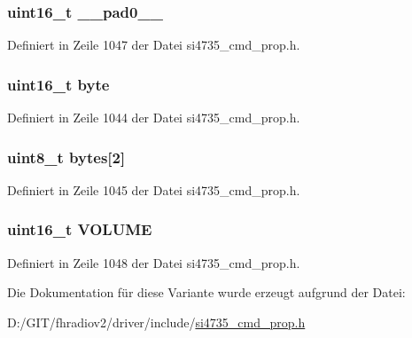 \subsubsection[{\+\_\+\+\_\+pad0\+\_\+\+\_\+}]{\setlength{\rightskip}{0pt plus 5cm}uint16\+\_\+t \+\_\+\+\_\+pad0\+\_\+\+\_\+}\label{unionrx__volume_a77132c2c26a75f5b8751b235cda23828}


Definiert in Zeile 1047 der Datei si4735\+\_\+cmd\+\_\+prop.\+h.

\hypertarget{unionrx__volume_ab0549c1b5ea980a02e7eab77e21fea49}{}
\subsubsection[{byte}]{\setlength{\rightskip}{0pt plus 5cm}uint16\+\_\+t byte}\label{unionrx__volume_ab0549c1b5ea980a02e7eab77e21fea49}


Definiert in Zeile 1044 der Datei si4735\+\_\+cmd\+\_\+prop.\+h.

\hypertarget{unionrx__volume_a46e4c05d20a047ec169f60d3167e912e}{}
\subsubsection[{bytes}]{\setlength{\rightskip}{0pt plus 5cm}uint8\+\_\+t bytes\mbox{[}2\mbox{]}}\label{unionrx__volume_a46e4c05d20a047ec169f60d3167e912e}


Definiert in Zeile 1045 der Datei si4735\+\_\+cmd\+\_\+prop.\+h.

\hypertarget{unionrx__volume_a03739146af570e536bfcb72ec21ffee9}{}
\subsubsection[{V\+O\+L\+U\+M\+E}]{\setlength{\rightskip}{0pt plus 5cm}uint16\+\_\+t V\+O\+L\+U\+M\+E}\label{unionrx__volume_a03739146af570e536bfcb72ec21ffee9}


Definiert in Zeile 1048 der Datei si4735\+\_\+cmd\+\_\+prop.\+h.



Die Dokumentation für diese Variante wurde erzeugt aufgrund der Datei\+:\begin{DoxyCompactItemize}
\item 
D\+:/\+G\+I\+T/fhradiov2/driver/include/\hyperlink{si4735__cmd__prop_8h}{si4735\+\_\+cmd\+\_\+prop.\+h}\end{DoxyCompactItemize}
